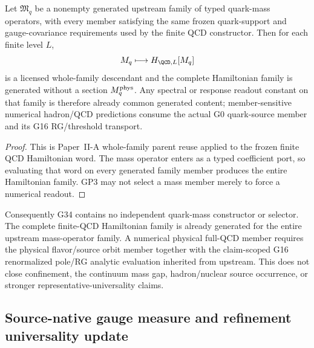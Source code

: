 \documentclass[12pt,a4paper]{article}
\begin{document}
\begin{corollary}
\label{p10:cor:whole-family-quark-mass-transport}
Let \(\mathfrak M_q\) be a nonempty generated upstream family of typed quark-mass operators, with every member satisfying the same frozen quark-support and gauge-covariance requirements used by the finite QCD constructor.  Then for each finite level \(L\),
\[
 M_q\longmapsto H_{\QCD,L}[M_q]
\]
is a licensed whole-family descendant and the complete Hamiltonian family is generated without a section \(M_q^{\rm phys}\).  Any spectral or response readout constant on that family is therefore already common generated content; member-sensitive numerical hadron/QCD predictions consume the actual G0 quark-source member and its G16 RG/threshold transport.
\end{corollary}

\begin{proof}
This is Paper~II-A whole-family parent reuse applied to the frozen finite QCD Hamiltonian word.  The mass operator enters as a typed coefficient port, so evaluating that word on every generated family member produces the entire Hamiltonian family.  GP3 may not select a mass member merely to force a numerical readout.
\end{proof}

\begin{corollary}[G34 disposition]
\label{p10:cor:v163-g34-disposition}
Consequently G34 contains no independent quark-mass constructor or selector.
The complete finite-QCD Hamiltonian family is already generated for the entire
upstream mass-operator family.  A numerical physical full-QCD member requires
the physical flavor/source orbit member together with the claim-scoped G16
renormalized pole/RG analytic evaluation inherited from upstream.  This does
not close confinement, the continuum mass gap, hadron/nuclear source
occurrence, or stronger representative-universality claims.
\end{corollary}


\subsection{Source-native gauge measure and refinement universality update}
\label{p10:sec:heat-action-universality-update}
\end{document}
